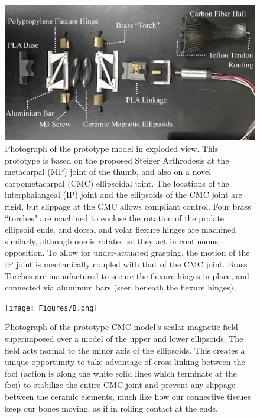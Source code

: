 \documentclass[letterpaper, 10 pt, conference]{ieeeconf}
\begin{document}
\begin{figure}
	\vspace{7pt}
	\centering
	\includegraphics[width = 1\columnwidth]{Figures/A4.png}
	\caption{Photograph of the prototype model in exploded view. This prototype is based on the proposed Steiger Arthrodesis at the metacarpal (MP) joint of the thumb, and also on a novel carpometacarpal (CMC) ellipsoidal joint. The locations of the interphalangeal (IP) joint and the ellipsoids of the CMC joint are rigid, but slippage at the CMC allows compliant control. Four brass ``torches" are machined to enclose the rotation of the prolate ellipsoid ends, and dorsal and volar flexure hinges are machined similarly, although one is rotated so they act in continuous opposition. To allow for under-actuated grasping, the motion of the IP joint is mechanically coupled with that of the CMC joint. Brass Torches are manufactured to secure the flexure hinges in place, and connected via aluminum bars (seen beneath the flexure hinges). }\label{thumbphoto}
	\vspace{-15pt}
\end{figure}

\begin{figure}
	\centering
    \vspace{7pt}
	\texttt{[image: Figures/B.png]}
	\caption{Photograph of the prototype CMC model's scalar magnetic field superimposed over a model of the upper and lower ellipsoids. The field acts normal to the minor axis of the ellipsoids. This creates a unique opportunity to take advantage of cross-linking between the foci (action is along the white solid lines which terminate at the foci) to stabilize the entire CMC joint and prevent any slippage between the ceramic elements, much like how our connective tissues keep our bones moving, as if in rolling contact at the ends.}\label{thumbphoto}
	\vspace{-15pt}
\end{figure}
\end{document}
